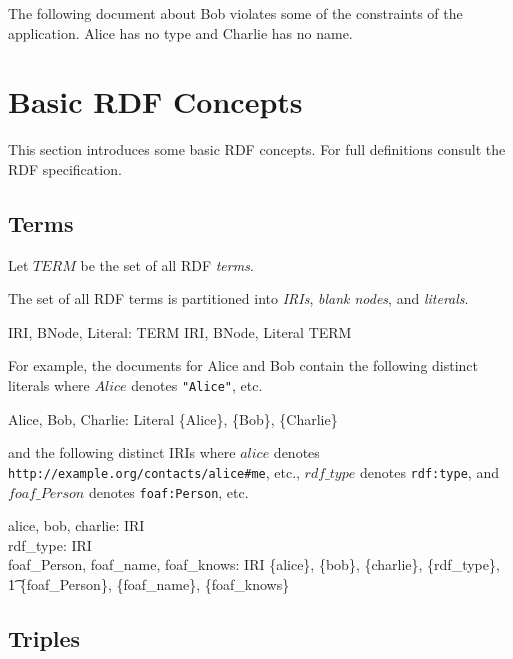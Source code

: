 \documentclass{article}
\begin{document}
The following document about Bob violates some of the constraints of the application.
Alice has no type and Charlie has no name.


\section{Basic RDF Concepts}
\label{sec-basics}

This section introduces some basic RDF concepts.
For full definitions consult the RDF specification\cite{w3c:rdf11}.

\subsection{Terms}

Let $TERM$ be the set of all RDF {\em terms}.
\begin{zed}
[TERM]
\end{zed}

The set of all RDF terms is partitioned into {\em IRIs}, {\em blank nodes}, and {\em literals}.
\begin{axdef}
IRI, BNode, Literal: \power TERM
\where
\langle IRI, BNode, Literal \rangle \partition TERM
\end{axdef}

For example, the documents for Alice and Bob contain the following distinct literals
where $Alice$ denotes {\tt "Alice"}, etc.
\begin{axdef}
	Alice, Bob, Charlie: Literal
\where
	\disjoint \langle \{Alice\}, \{Bob\}, \{Charlie\} \rangle
\end{axdef}
and the following distinct IRIs where $alice$ denotes {\tt http://example.org/contacts/alice\#me}, etc., 
$rdf\_type$ denotes {\tt rdf:type}, and
$foaf\_Person$ denotes {\tt foaf:Person}, etc.
\begin{axdef}
	alice, bob, charlie: IRI \\
	rdf\_type: IRI \\
	foaf\_Person, foaf\_name, foaf\_knows: IRI
\where
	\disjoint \langle \{alice\}, \{bob\}, \{charlie\}, \{rdf\_type\}, \\
\t1		\{foaf\_Person\}, \{foaf\_name\}, \{foaf\_knows\} \rangle
\end{axdef}

\subsection{Triples}
\end{document}
